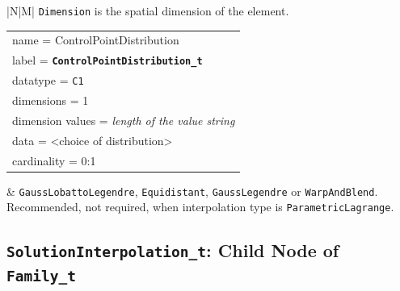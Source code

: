 \documentclass[11pt,letterpaper]{article}
\begin{document}
{\begin{tabularx}{\linewidth}{|N|M|}
\texttt{Dimension} is the spatial dimension of the element. \\
\hline
\quad\quad\begin{tabular}[t]{@{}l@{}}
  name = ControlPointDistribution \\
  label = \texttt{\textbf{ControlPointDistribution\_t}} \\
  datatype = \texttt{C1} \\
  dimensions = 1 \\
  dimension values = \textit{length of the value string} \\
  data = \textless{}choice of distribution\textgreater{} \\
  cardinality = 0:1
\end{tabular}
&
\texttt{GaussLobattoLegendre},\newline
\texttt{Equidistant},\newline
\texttt{GaussLegendre} or\newline
\texttt{WarpAndBlend}.\newline\newline
Recommended, not required, when interpolation type is
\texttt{ParametricLagrange}. \\
\hline
\end{tabularx}
}

\newpage
\subsection{\texttt{SolutionInterpolation\_t}: Child Node of \texttt{Family\_t}}
\end{document}

